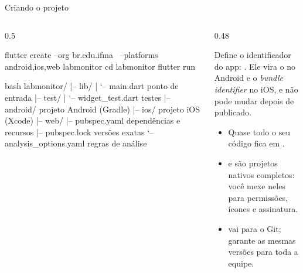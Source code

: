 \documentclass[aspectratio=169,10pt]{beamer}
\begin{document}
\begin{frame}[fragile]{Criando o projeto}
  \begin{columns}[T]
    \begin{column}{0.5\textwidth}
\begin{terminal}[title=Criando pelo terminal]
flutter create --org br.edu.ifma \
  --platforms android,ios,web labmonitor
cd labmonitor
flutter run
\end{terminal}
\begin{codigo}[title=labmonitor/,listing options={style=dm,language=bash,basicstyle=\ttfamily\tiny}]{bash}
labmonitor/
|-- lib/
|   `-- main.dart          ponto de entrada
|-- test/
|   `-- widget_test.dart   testes
|-- android/               projeto Android (Gradle)
|-- ios/                   projeto iOS (Xcode)
|-- web/
|-- pubspec.yaml           dependências e recursos
|-- pubspec.lock           versões exatas
`-- analysis_options.yaml  regras de análise
\end{codigo}
    \end{column}
    \begin{column}{0.48\textwidth}
      \begin{conceito}
        Define o identificador do app: . Ele vira o  no Android e o \emph{bundle identifier} no iOS, e não pode mudar depois de publicado.
      \end{conceito}
      \begin{itemize}
        \item Quase todo o seu código fica em .
        \item {} e  são projetos nativos completos: você mexe neles para permissões, ícones e assinatura.
        \item \arq{pubspec.lock} vai para o Git; garante as mesmas versões para toda a equipe.
      \end{itemize}
    \end{column}
  \end{columns}
\end{frame}
\end{document}
